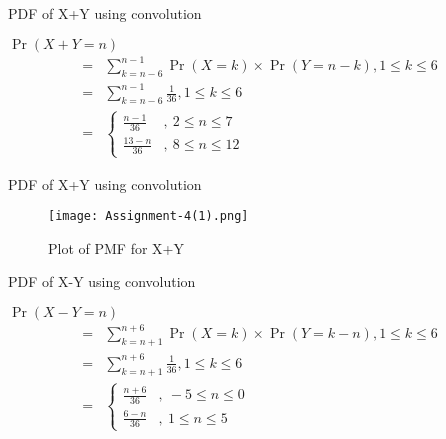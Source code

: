 \documentclass{beamer}
\providecommand{\brak}[1]{\ensuremath{\left(#1\right)}}
\begin{document}
\begin{frame}{PDF of X+Y using convolution}
    \begin{block}{}
        $\Pr\brak{X+Y=n}$
        \begin{align}
            =&\sum_{k=n-6}^{n-1} \Pr\brak{X=k}\times\Pr\brak{Y=n-k}, 1\leq k \leq 6\\
            =&\sum_{k=n-6}^{n-1} \frac{1}{36}, 1\leq k \leq 6\label{0.0.12}\\
            =&
            \left\{
	        \begin{array}{ll}
		        \frac{n-1}{36}  & ,\: 2 \leq n \leq 7 \\
		        \frac{13-n}{36} & ,\: 8 \leq n \leq 12
	        \end{array}
            \right.
        \end{align}
    \end{block}
\end{frame}

\begin{frame}{PDF of X+Y using convolution}
    \begin{figure}[htb]
        \texttt{[image: Assignment-4(1).png]}
        \caption{Plot of PMF for X+Y}
    \end{figure}
\end{frame}

\begin{frame}{PDF of X-Y using convolution}
    \begin{block}{}
        $\Pr\brak{X-Y=n}$
        \begin{align}
            =&\sum_{k=n+1}^{n+6} \Pr\brak{X=k}\times\Pr\brak{Y=k-n}, 1\leq k \leq 6\\
            =&\sum_{k=n+1}^{n+6} \frac{1}{36}, 1\leq k \leq 6\label{0.0.16}\\
            =&
            \left\{
	        \begin{array}{ll}
		        \frac{n+6}{36} & ,\: -5 \leq n \leq 0 \\
		        \frac{6-n}{36} & ,\: 1  \leq n \leq 5
	        \end{array}
            \right.
        \end{align}
    \end{block}
\end{frame}
\end{document}

